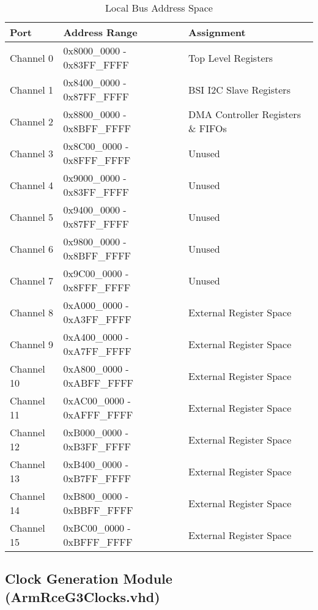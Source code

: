 \documentclass[11pt]{article}
\begin{document}
\begin{table}[H]
\small
\centering
   \begin{tabular}{| l | l | l | } 
      \hline \textbf{Port} & \textbf{Address Range} & \textbf{Assignment} \\
      \hline Channel 0  & 0x8000\_0000 - 0x83FF\_FFFF & Top Level Registers \\
      \hline Channel 1  & 0x8400\_0000 - 0x87FF\_FFFF & BSI I2C Slave Registers \\
      \hline Channel 2  & 0x8800\_0000 - 0x8BFF\_FFFF & DMA Controller Registers \& FIFOs \\
      \hline Channel 3  & 0x8C00\_0000 - 0x8FFF\_FFFF & Unused \\
      \hline Channel 4  & 0x9000\_0000 - 0x83FF\_FFFF & Unused \\
      \hline Channel 5  & 0x9400\_0000 - 0x87FF\_FFFF & Unused \\
      \hline Channel 6  & 0x9800\_0000 - 0x8BFF\_FFFF & Unused \\
      \hline Channel 7  & 0x9C00\_0000 - 0x8FFF\_FFFF & Unused \\
      \hline Channel 8  & 0xA000\_0000 - 0xA3FF\_FFFF & External Register Space \\
      \hline Channel 9  & 0xA400\_0000 - 0xA7FF\_FFFF & External Register Space \\
      \hline Channel 10 & 0xA800\_0000 - 0xABFF\_FFFF & External Register Space \\
      \hline Channel 11 & 0xAC00\_0000 - 0xAFFF\_FFFF & External Register Space \\
      \hline Channel 12 & 0xB000\_0000 - 0xB3FF\_FFFF & External Register Space \\
      \hline Channel 13 & 0xB400\_0000 - 0xB7FF\_FFFF & External Register Space \\
      \hline Channel 14 & 0xB800\_0000 - 0xBBFF\_FFFF & External Register Space \\
      \hline Channel 15 & 0xBC00\_0000 - 0xBFFF\_FFFF & External Register Space \\
      \hline
   \end{tabular}
   \caption{Local Bus Address Space }
   \label{tab:lb_addr_ports}
\end{table}

\subsection{Clock Generation Module (ArmRceG3Clocks.vhd)}
\label{subsec:ArmRceG3Clocks}
\end{document}
